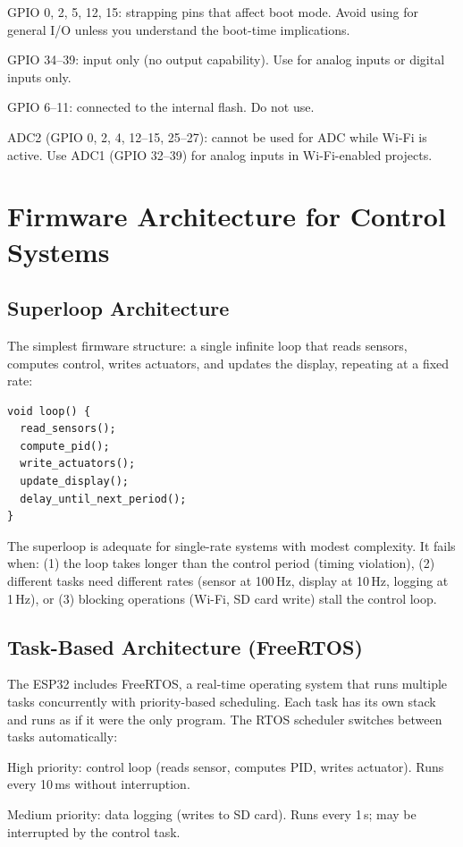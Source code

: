 GPIO 0, 2, 5, 12, 15: strapping pins that affect boot mode. Avoid using for general I/O unless you understand the boot-time implications.

GPIO 34--39: input only (no output capability). Use for analog inputs or digital inputs only.

GPIO 6--11: connected to the internal flash. Do not use.

ADC2 (GPIO 0, 2, 4, 12--15, 25--27): cannot be used for ADC while Wi-Fi is active. Use ADC1 (GPIO 32--39) for analog inputs in Wi-Fi-enabled projects.

\section{Firmware Architecture for Control Systems}
\subsection{Superloop Architecture}
The simplest firmware structure: a single infinite loop that reads sensors, computes control, writes actuators, and updates the display, repeating at a fixed rate:

\begin{verbatim}
void loop() {
  read_sensors();
  compute_pid();
  write_actuators();
  update_display();
  delay_until_next_period();
}
\end{verbatim}

The superloop is adequate for single-rate systems with modest complexity. It fails when: (1) the loop takes longer than the control period (timing violation), (2) different tasks need different rates (sensor at 100\,Hz, display at 10\,Hz, logging at 1\,Hz), or (3) blocking operations (Wi-Fi, SD card write) stall the control loop.

\subsection{Task-Based Architecture (FreeRTOS)}
The ESP32 includes FreeRTOS, a real-time operating system that runs multiple tasks concurrently with priority-based scheduling. Each task has its own stack and runs as if it were the only program. The RTOS scheduler switches between tasks automatically:

High priority: control loop (reads sensor, computes PID, writes actuator). Runs every 10\,ms without interruption.

Medium priority: data logging (writes to SD card). Runs every 1\,s; may be interrupted by the control task.


